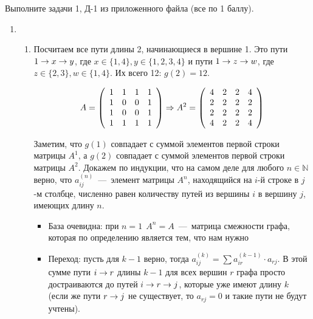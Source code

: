 \documentclass[a4paper,12pt]{article}
\begin{document}
\begin{task}
	Выполните задачи 1, Д-1 из приложенного файла (все по 1 баллу).
\end{task}

\begin{solution}
	
	\begin{enumerate}
		\item \begin{enumerate}
			\item Посчитаем все пути длины 2, начинающиеся в вершине 1. Это пути $1\rightarrow x \rightarrow y$, где $x \in \{1, 4\}, y \in \{1, 2, 3, 4\}$ и пути $1\rightarrow z \rightarrow w$, где $z \in \{2, 3\}, w\in \{1, 4\}$. Их всего 12: $g(2) = 12$.
			
			\begin{equation*}
			A = \left(
			\begin{array}{cccc}
			1 & 1 & 1 & 1\\
			1 & 0 & 0 & 1\\
			1 & 0 & 0 & 1\\
			1 & 1 & 1 & 1
			\end{array}
			\right) \Rightarrow A^2 = \left(
			\begin{array}{cccc}
			4 & 2 & 2 & 4\\
			2 & 2 & 2 & 2\\
			2 & 2 & 2 & 2\\
			4 & 2 & 2 & 4
			\end{array}
			\right)
			\end{equation*}
			
			Заметим, что $g(1)$ совпадает с суммой элементов первой строки матрицы $A^1$, а $g(2)$ совпадает с суммой элементов первой строки матрицы $A^2$. Докажем по индукции, что на самом деле для любого $n\in \mathbb{N}$ верно, что $ a^{(n)}_{ij}$~---~элемент матрицы $A^n$, находящийся на $i$-й строке в $j$-м столбце, численно равен количеству путей из вершины $i$ в вершину $j$, имеющих длину $n$.
			
			\begin{itemize}
				\item База очевидна: при $n=1 \ \ A^n=A$~---~матрица смежности графа, которая по определению является тем, что нам нужно
				\item Переход: пусть для $k-1$ верно, тогда $a^{(k)}_{ij} = \displaystyle \sum a^{(k-1)}_{ir} \cdot a_{rj}$. В этой сумме пути $i\rightarrow r$ длины $k-1$ для всех вершин $r$ графа просто достраиваются до путей $i\rightarrow r \rightarrow j$, которые уже имеют длину $k$ (если же пути $r \rightarrow j$ не существует, то $a_{rj} = 0$ и такие пути не будут учтены). 
				

\end{itemize}
\end{enumerate}
\end{enumerate}
\end{solution}
\end{document}
